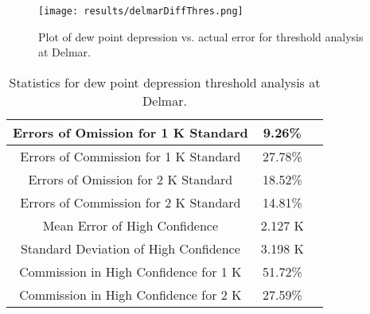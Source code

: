 \documentclass{book}
\begin{document}
\begin{minipage}[c]{0.47\textwidth}
\centering
\begin{figure}[H]
\texttt{[image: results/delmarDiffThres.png]}
\caption{Plot of dew point depression vs. actual error for threshold analysis at Delmar.}
\label{fig:delmarDiffThres}
\end{figure}
\end{minipage}
\begin{minipage}[c]{0.47\textwidth}
\begin{table}[H]
\centering
\footnotesize
\begin{tabular}{ | c | c | c | } \hline
Errors of Omission for 1 K Standard & 9.26\% \\ \hline
Errors of Commission for 1 K Standard & 27.78\% \\ \hline
Errors of Omission for 2 K Standard & 18.52\% \\ \hline
Errors of Commission for 2 K Standard & 14.81\% \\ \hline
Mean Error of High Confidence & 2.127 K \\ \hline
Standard Deviation of High Confidence & 3.198 K \\ \hline
Commission in High Confidence for 1 K & 51.72\% \\ \hline
Commission in High Confidence for 2 K & 27.59\% \\ \hline
\end{tabular}
\caption{Statistics for dew point depression threshold analysis at Delmar.}
\label{tab:delmarDiffThres}
\end{table}
\end{minipage}
\end{document}
